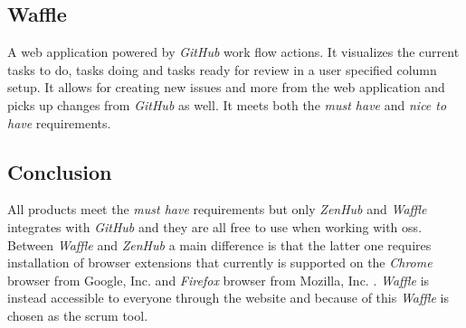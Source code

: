 \subsection*{Waffle}
A web application powered by \textit{GitHub} work flow actions. 
It visualizes the current tasks to do, tasks doing and tasks ready for review in a user specified column setup. 
It allows for creating new issues and more from the web application and picks up changes from \textit{GitHub} as well. 
It meets both the \textit{must have} and \textit{nice to have} requirements.

\subsection*{Conclusion}
All products meet the \textit{must have} requirements but only \textit{ZenHub} and \textit{Waffle} integrates with \textit{GitHub} and they are all free to use when working with \gls{oss}.
Between \textit{Waffle} and \textit{ZenHub} a main difference is that the latter one requires installation of browser extensions that currently is supported on the \textit{Chrome} browser from Google, Inc. and \textit{Firefox} browser from Mozilla, Inc.  \citep{preStudy:scrum:zenhub}.
\textit{Waffle} is instead accessible to everyone through the website and because of this \textit{Waffle} is chosen as the \gls{scrum} tool.
